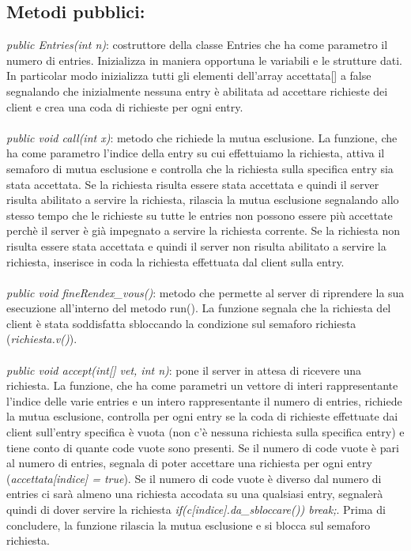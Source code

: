 \documentclass[10pt, a4paper]{article}
\begin{document}
\subsection{Metodi pubblici:}
\textit{public Entries(int n)}: costruttore della classe Entries che ha come parametro il numero di entries. Inizializza in maniera opportuna le variabili e le strutture dati. In particolar modo inizializza tutti gli elementi dell'array accettata[] a false segnalando che inizialmente nessuna entry è abilitata ad accettare richieste dei client e crea una coda di richieste per ogni entry.
\\\\
\textit{public void call(int x)}: metodo che richiede la mutua esclusione. La funzione, che ha come parametro l'indice della entry su cui effettuiamo la richiesta, attiva il semaforo di mutua esclusione e controlla che la richiesta sulla specifica entry sia stata accettata. Se la richiesta risulta essere stata accettata e quindi il server risulta abilitato a servire la richiesta, rilascia la mutua esclusione segnalando allo stesso tempo che le richieste su tutte le entries non possono essere più accettate perchè il server è già impegnato a servire la richiesta corrente. Se la richiesta non risulta essere stata accettata e quindi il server non risulta abilitato a servire la richiesta, inserisce in coda la richiesta effettuata dal client sulla entry.
\\\\
\textit{public void fineRendex\_vous()}: metodo che permette al server di riprendere la sua esecuzione all'interno del metodo run(). La funzione segnala che la richiesta del client è stata soddisfatta sbloccando la condizione sul semaforo richiesta (\textit{richiesta.v()}).
\\\\
\textit{public void accept(int[] vet, int n)}: pone il server in attesa di ricevere una richiesta. La funzione, che ha come parametri un vettore di interi rappresentante l'indice delle varie entries e un intero rappresentante il numero di entries, richiede la mutua esclusione, controlla per ogni entry se la coda di richieste effettuate dai client sull'entry specifica è vuota (non c'è nessuna richiesta sulla specifica entry) e tiene conto di quante code vuote sono presenti. Se il numero di code vuote è pari al numero di entries, segnala di poter accettare una richiesta per ogni entry (\textit{accettata[indice] = true}). Se il numero di code vuote è diverso dal numero di entries ci sarà almeno una richiesta accodata su una qualsiasi entry, segnalerà quindi di dover servire la richiesta \textit{if(c[indice].da\_sbloccare()) break;}. Prima di concludere, la funzione rilascia la mutua esclusione e si blocca sul semaforo richiesta.
\end{document}

